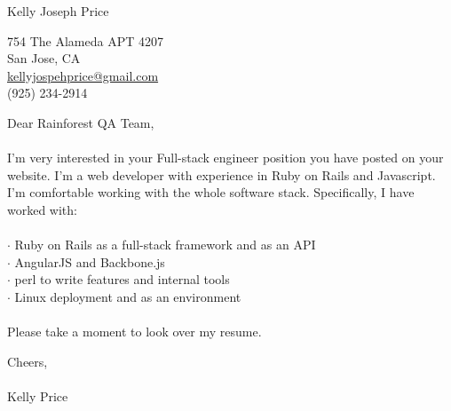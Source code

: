 \documentclass{article}
\begin{document}
\huge{Kelly Joseph Price}
\normalsize

\hspace{.5cm}

754 The Alameda APT 4207 \\
San Jose, CA \\
\href{mailto:kellyjosephprice@gmail.com}{kellyjospehprice@gmail.com} \\
(925) 234-2914 \\

\vspace{6cm}

Dear Rainforest QA Team,
\\\\
I'm very interested in your Full-stack engineer position you have
posted on your website. I'm a web developer with experience in Ruby on
Rails and Javascript. I'm comfortable working with the whole software
stack. Specifically, I have worked with: \\
\\
$\cdot$ Ruby on Rails as a full-stack framework and as an API \\
$\cdot$ AngularJS and Backbone.js \\
$\cdot$ perl to write features and internal tools \\
$\cdot$ Linux deployment and as an environment \\
\\
Please take a moment to look over my resume.

\vspace{1cm}

Cheers,
\\\\
Kelly Price
\end{document}
